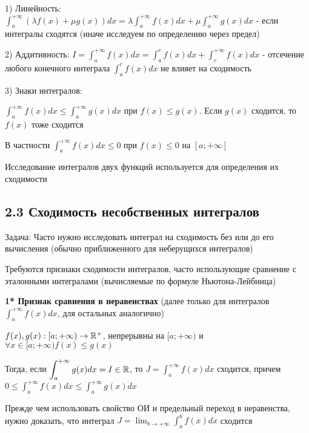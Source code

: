 \documentclass[12pt]{article}
\begin{document}
    1) Линейность: $\displaystyle \int^{+\infty}_{a} (\lambda f(x) + \mu g(x)) dx = \lambda \int^{+\infty}_{a} f(x) dx + \mu \int^{+\infty}_{a} g(x) dx$
    - если интегралы сходятся (иначе исследуем по определению через предел)

    2) Аддитивность: $\displaystyle I = \int^{+\infty}_{a} f(x) dx = \int^{c}_{a} f(x) dx + \int^{+\infty}_{c} f(x) dx$
    - отсечение любого конечного интеграла $\int^{c}_{a} f(x) dx$ не влияет на сходимость

    3) Знаки интегралов:

    $\displaystyle \int^{+\infty}_{a} f(x) dx \leq \int^{+\infty}_{a} g(x) dx $ при $f(x) \leq g(x)$. Если $g(x)$ сходится, то $f(x)$ тоже сходится

    В частности $\displaystyle \int^{+\infty}_{a} f(x) dx \leq 0$ при $f(x) \leq 0$ на $[a; +\infty]$

    \Nota Исследование интегралов двух функций используется для определения их сходимости


    \subsection{2.3 Сходимость несобственных интегралов}
    \hypertarget{improperintegralconvergence}{}

    Задача: Часто нужно исследовать интеграл на сходимость без или до его вычисления (обычно приближенного для неберущихся интегралов)

    Требуются признаки сходимости интегралов, часто использующие сравнение с эталонными интегралами (вычисляемые по формуле Ньютона-Лейбница)

    \hypertarget{improperintegralconvergenceininequalities}{}
    \textbf{1* Признак сравнения в неравенствах} (далее только для интегралов $\displaystyle \int^{+\infty}_{a} f(x) dx$, для остальных аналогично)

    $f(x), g(x) : [a;+\infty) \to \mathbb{R}^+$, непрерывны на $[a;+\infty)$ и $\forall x \in [a;+\infty) f(x) \leq g(x)$


    Тогда, если $\displaystyle \int^{+\infty}_{a} g(x) dx = I \in \mathbb{R}$, то $\displaystyle J = \int^{+\infty}_{a} f(x) dx$ сходится,
    причем $\displaystyle0 \leq \int^{+\infty}_{a} f(x) dx \leq \int^{+\infty}_{a} g(x) dx$

    Прежде чем использовать свойство ОИ и предельный переход в неравенства,
    нужно доказать, что интеграл $\displaystyle J = \lim_{b \to +\infty} \int^{b}_{a} f(x) dx$ сходится
\end{document}
